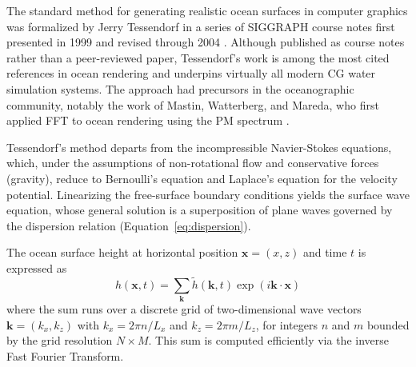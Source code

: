    The standard method for generating realistic ocean surfaces in computer graphics was formalized by Jerry Tessendorf in a series of SIGGRAPH course notes first presented in 1999 and revised through 2004 \cite{Tessendorf2004}. Although published as course notes rather than a peer-reviewed paper, Tessendorf's work is among the most cited references in ocean rendering and underpins virtually all modern CG water simulation systems. The approach had precursors in the oceanographic community, notably the work of Mastin, Watterberg, and Mareda, who first applied FFT to ocean rendering using the PM spectrum \cite{Mastin1987}.

    Tessendorf's method departs from the incompressible Navier-Stokes equations, which, under the assumptions of non-rotational flow and conservative forces (gravity), reduce to Bernoulli's equation and Laplace's equation for the velocity potential. Linearizing the free-surface boundary conditions yields the surface wave equation, whose general solution is a superposition of plane waves governed by the dispersion relation (Equation~\ref{eq:dispersion}).

    The ocean surface height at horizontal position $\mathbf{x} = (x, z)$ and time $t$ is expressed as
    \begin{equation}
        h(\mathbf{x}, t) = \sum_{\mathbf{k}} \tilde{h}(\mathbf{k}, t) \exp(i\mathbf{k} \cdot \mathbf{x})
        \label{eq:fft_height}
    \end{equation}
    where the sum runs over a discrete grid of two-dimensional wave vectors $\mathbf{k} = (k_x, k_z)$ with $k_x = 2\pi n / L_x$ and $k_z = 2\pi m / L_z$, for integers $n$ and $m$ bounded by the grid resolution $N \times M$. This sum is computed efficiently via the inverse Fast Fourier Transform.

